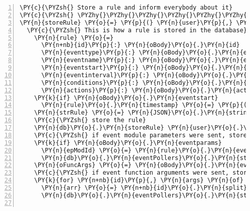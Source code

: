 \begin{Verbatim}[fontsize=\scriptsize,commandchars=\\\{\},numbers=left,firstnumber=1,stepnumber=1]
\PY{c}{\PYZsh{} Store a rule and inform everybody about it}
\PY{c}{\PYZsh{} \PYZhy{}\PYZhy{}\PYZhy{}\PYZhy{}\PYZhy{}\PYZhy{}\PYZhy{}\PYZhy{}\PYZhy{}\PYZhy{}\PYZhy{}\PYZhy{}\PYZhy{}\PYZhy{}\PYZhy{}\PYZhy{}\PYZhy{}\PYZhy{}\PYZhy{}\PYZhy{}\PYZhy{}\PYZhy{}\PYZhy{}\PYZhy{}\PYZhy{}\PYZhy{}\PYZhy{}\PYZhy{}\PYZhy{}\PYZhy{}\PYZhy{}\PYZhy{}\PYZhy{}\PYZhy{}\PYZhy{}\PYZhy{}\PYZhy{}\PYZhy{}\PYZhy{}\PYZhy{}\PYZhy{}\PYZhy{}}
\PY{n}{storeRule} \PY{o}{=} \PY{p}{(} \PY{n}{user}\PY{p}{,} \PY{n}{oBody}\PY{p}{,} \PY{n}{callback} \PY{p}{)} \PY{o}{=}\PY{o}{\PYZgt{}}
  \PY{c}{\PYZsh{} This is how a rule is stored in the database}
    \PY{n}{rule} \PY{o}{=}
      \PY{n+nb}{id}\PY{p}{:} \PY{n}{oBody}\PY{o}{.}\PY{n}{id}
      \PY{n}{eventtype}\PY{p}{:} \PY{n}{oBody}\PY{o}{.}\PY{n}{eventtype}
      \PY{n}{eventname}\PY{p}{:} \PY{n}{oBody}\PY{o}{.}\PY{n}{eventname}
      \PY{n}{eventstart}\PY{p}{:} \PY{n}{oBody}\PY{o}{.}\PY{n}{eventstart}
      \PY{n}{eventinterval}\PY{p}{:} \PY{n}{oBody}\PY{o}{.}\PY{n}{eventinterval}
      \PY{n}{conditions}\PY{p}{:} \PY{n}{oBody}\PY{o}{.}\PY{n}{conditions}
      \PY{n}{actions}\PY{p}{:} \PY{n}{oBody}\PY{o}{.}\PY{n}{actions}
    \PY{k}{if} \PY{n}{oBody}\PY{o}{.}\PY{n}{eventstart}
      \PY{n}{rule}\PY{o}{.}\PY{n}{timestamp} \PY{o}{=} \PY{p}{(}\PY{n}{new} \PY{n}{Date}\PY{p}{(}\PY{p}{)}\PY{p}{)}\PY{o}{.}\PY{n}{toISOString}\PY{p}{(}\PY{p}{)}
    \PY{n}{strRule} \PY{o}{=} \PY{n}{JSON}\PY{o}{.}\PY{n}{stringify} \PY{n}{rule}
    \PY{c}{\PYZsh{} store the rule}
    \PY{n}{db}\PY{o}{.}\PY{n}{storeRule} \PY{n}{user}\PY{o}{.}\PY{n}{username}\PY{p}{,} \PY{n}{rule}\PY{o}{.}\PY{n}{id}\PY{p}{,} \PY{n}{strRule}
    \PY{c}{\PYZsh{} if event module parameters were sent, store them}
    \PY{k}{if} \PY{n}{oBody}\PY{o}{.}\PY{n}{eventparams}
      \PY{n}{epModId} \PY{o}{=} \PY{n}{rule}\PY{o}{.}\PY{n}{eventname}\PY{o}{.}\PY{n}{split}\PY{p}{(} \PY{l+s}{\PYZsq{}}\PY{l+s}{ \PYZhy{}\PYZgt{} }\PY{l+s}{\PYZsq{}} \PY{p}{)}\PY{p}{[} \PY{l+m+mi}{0} \PY{p}{]}
      \PY{n}{db}\PY{o}{.}\PY{n}{eventPollers}\PY{o}{.}\PY{n}{storeUserParams} \PY{n}{epModId}\PY{p}{,} \PY{n}{user}\PY{o}{.}\PY{n}{username}\PY{p}{,} \PY{n}{JSON}\PY{o}{.}\PY{n}{stringify} \PY{n}{oBody}\PY{o}{.}\PY{n}{eventparams}
    \PY{n}{oFuncArgs} \PY{o}{=} \PY{n}{oBody}\PY{o}{.}\PY{n}{eventfunctions}
    \PY{c}{\PYZsh{} if event function arguments were sent, store them}
    \PY{k}{for} \PY{n+nb}{id}\PY{p}{,} \PY{n}{args} \PY{n}{of} \PY{n}{oFuncArgs}
      \PY{n}{arr} \PY{o}{=} \PY{n+nb}{id}\PY{o}{.}\PY{n}{split} \PY{l+s}{\PYZsq{}}\PY{l+s}{ \PYZhy{}\PYZgt{} }\PY{l+s}{\PYZsq{}}
      \PY{n}{db}\PY{o}{.}\PY{n}{eventPollers}\PY{o}{.}\PY{n}{storeUserArguments} \PY{n}{user}\PY{o}{.}\PY{n}{username}\PY{p}{,} \PY{n}{rule}\PY{o}{.}\PY{n}{id}\PY{p}{,} \PY{n}{arr}\PY{p}{[} \PY{l+m+mi}{0} \PY{p}{]}\PY{p}{,} \PY{n}{arr}\PY{p}{[} \PY{l+m+mi}{1} \PY{p}{]}\PY{p}{,} \PY{n}{JSON}\PY{o}{.}\PY{n}{stringify} \PY{n}{args} 
    

\end{Verbatim}
